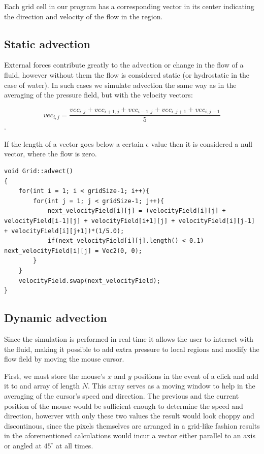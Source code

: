 \documentclass[12pt, titlepage]{article}
\begin{document}
Each grid cell in our program has a corresponding vector in its center indicating the direction and velocity of the flow in the region.

\subsection{Static advection}

External forces contribute greatly to the advection or change in the flow of a fluid, however without them the flow is considered static (or hydrostatic in the case of water). In such cases we simulate advection the same way as in the averaging of the pressure field, but with the velocity vectors:

\[
vec_{i,j} = \frac{vec_{i,j} + vec_{i+1,j} + vec_{i-1,j} + vec_{i,j+1} + vec_{i,j-1}}{5}
\].

\noindent If the length of a vector goes below a certain $\epsilon$ value then it is considered a null vector, where the flow is zero.

\begin{lstlisting}
void Grid::advect()
{
    for(int i = 1; i < gridSize-1; i++){
        for(int j = 1; j < gridSize-1; j++){
            next_velocityField[i][j] = (velocityField[i][j] + velocityField[i-1][j] + velocityField[i+1][j] + velocityField[i][j-1] + velocityField[i][j+1])*(1/5.0);
            if(next_velocityField[i][j].length() < 0.1) next_velocityField[i][j] = Vec2(0, 0);
        }
    }
    velocityField.swap(next_velocityField);
}
\end{lstlisting}

\subsection{Dynamic advection}

Since the simulation is performed in real-time it allows the user to interact with the fluid, making it possible to add extra pressure to local regions and modify the flow field by moving the mouse cursor.

\bigskip

First, we must store the mouse's $x$ and $y$ positions in the event of a click and add it to and array of length $N$. This array serves as a moving window to help in the averaging of the cursor's speed and direction. The previous and the current position of the mouse would be sufficient enough to determine the speed and direction, howerver with only these two values the result would look choppy and discontinous, since the pixels themselves are arranged in a grid-like fashion results in the aforementioned calculations would incur a vector either parallel to an axis or angled at $45^{\circ}$ at all times.
\end{document}
